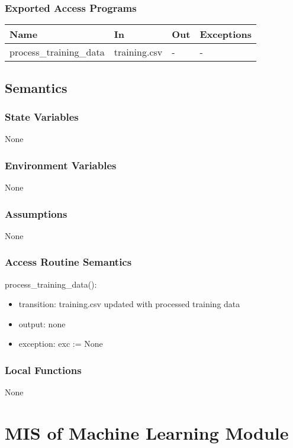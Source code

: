 \documentclass[12pt, titlepage]{article}
\begin{document}
\subsubsection{Exported Access Programs}
\begin{center}
\begin{tabular}{p{5cm} p{3cm} p{2cm} p{2cm}}
\hline
\textbf{Name} & \textbf{In} & \textbf{Out} & \textbf{Exceptions} \\
\hline
process\_training\_data & training.csv & - & - \\
\hline
\end{tabular}
\end{center}
\subsection{Semantics}
\subsubsection{State Variables}
None
\subsubsection{Environment Variables}
None
\subsubsection{Assumptions}
None
\subsubsection{Access Routine Semantics}
\noindent process\_training\_data():
\begin{itemize}
    \item transition: training.csv updated with processed training data
    \item output: none
    \item exception: exc := None
\end{itemize}
\subsubsection{Local Functions}
None

\newpage

\section{MIS of Machine Learning Module} \label{Module} 
\end{document}
